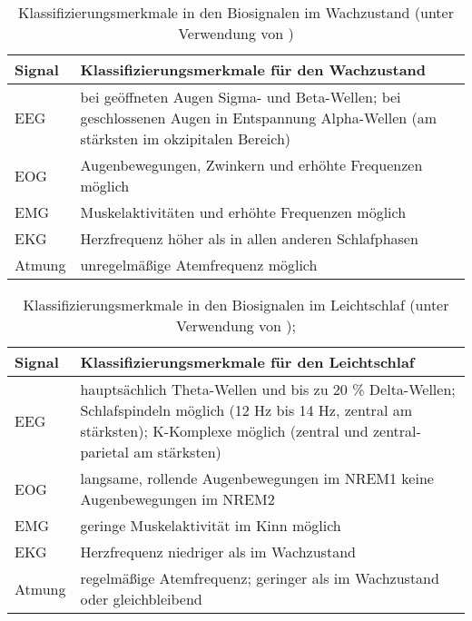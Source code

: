 \begin{table}[H]
\begin{small}
\centering
\begin{tabular}{|l|p{13cm}|}
\hline
\textbf{Signal} & \textbf{Klassifizierungsmerkmale für den Wachzustand} \\
\hline
\acs{EEG} & bei geöffneten Augen Sigma- und Beta-Wellen; bei geschlossenen Augen in Entspannung Alpha-Wellen (am stärksten im okzipitalen Bereich)\\
\hline
\acs{EOG} & Augenbewegungen, Zwinkern und erhöhte Frequenzen möglich\\
\hline
\acs{EMG} & Muskelaktivitäten und erhöhte Frequenzen möglich\\
\hline
\acs{EKG} & Herzfrequenz höher als in allen anderen Schlafphasen\\
\hline
Atmung & unregelmäßige Atemfrequenz möglich\\
\hline
\end{tabular}
\caption[Klassifizierungsmerkmale im Wachzustand]{Klassifizierungsmerkmale in den Biosignalen im Wachzustand (unter Verwendung von \parencite{lee-chiong_sleep_2008, steinberg_schlafmedizin_2010, rasche_update_2003, ebner_eeg_2006})}
\label{tab:wach}
\end{small}
\end{table}

\begin{table}[h]
\begin{small}
\centering
\begin{tabular}{|l|p{13cm}|}
\hline
\textbf{Signal} & \textbf{Klassifizierungsmerkmale für den Leichtschlaf} \\
\hline
\acs{EEG} & hauptsächlich Theta-Wellen und bis zu 20 \% Delta-Wellen; Schlafspindeln möglich (12 Hz bis 14 Hz, zentral am stärksten); K-Komplexe möglich (zentral und zentral-parietal am stärksten)\\
\hline
\acs{EOG} & langsame, rollende Augenbewegungen im \acs{NREM}1 keine Augenbewegungen im \acs{NREM}2\\
\hline
\acs{EMG} & geringe Muskelaktivität im Kinn möglich\\
\hline
\acs{EKG} & Herzfrequenz niedriger als im Wachzustand\\
\hline
Atmung & regelmäßige Atemfrequenz; geringer als im Wachzustand oder gleichbleibend\\
\hline
\end{tabular}
\caption[Klassifizierungsmerkmale im Leichtschlaf]{Klassifizierungsmerkmale in den Biosignalen im Leichtschlaf (unter Verwendung von \parencite{lee-chiong_sleep_2008, steinberg_schlafmedizin_2010, rasche_update_2003, ebner_eeg_2006});}
\label{tab:leichtschlaf}
\end{small}
\end{table}

